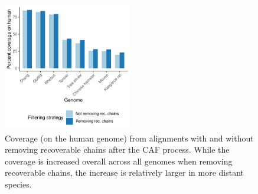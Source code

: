 \documentclass{article}
\begin{document}
\begin{figure}
\begin{center}
\includegraphics[width=0.5\textwidth]{rc_vs_no_rc.pdf}
\caption{Coverage (on the human genome) from alignments with and without removing recoverable chains after the CAF process. While the coverage is increased overall across all genomes when removing recoverable chains, the increase is relatively larger in more distant species.}\label{fig:rc_vs_no_rc}
\end{center}
\end{figure}

\end{document}
